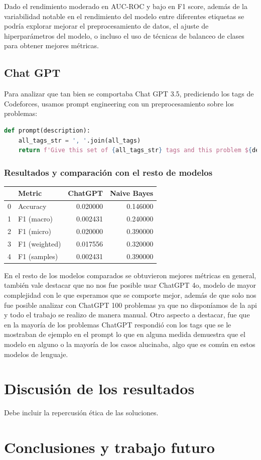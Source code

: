 \documentclass{article}
\begin{document}
    Dado el rendimiento moderado en AUC-ROC y bajo en F1 score, además de la variabilidad notable en 
    el rendimiento del modelo entre diferentes etiquetas se podría explorar mejorar el 
    preprocesamiento de datos, el ajuste de hiperparámetros del modelo, o incluso el uso de técnicas 
    de balanceo de clases para obtener mejores métricas.

\subsection{Chat GPT}

Para analizar que tan bien se comportaba Chat GPT 3.5, prediciendo los tags de Codeforces, usamos prompt engineering
con un preprocesamiento sobre los problemas:

\begin{lstlisting}[language=Python, caption=Prompt para tagear los problemas]
def prompt(description):
    all_tags_str = ', '.join(all_tags)
    return f'Give this set of {all_tags_str} tags and this problem ${description}, give me the set of problem tags in the following format: greedy, implementation, dp'
\end{lstlisting}

\subsubsection{Resultados y comparación con el resto de modelos}

\begin{tabular}{llrr}
    \toprule
    {} & Metric        & ChatGPT  & Naive Bayes \\
    \midrule
    0  & Accuracy      & 0.020000 & 0.146000    \\
    1  & F1 (macro)    & 0.002431 & 0.240000    \\
    2  & F1 (micro)    & 0.020000 & 0.390000    \\
    3  & F1 (weighted) & 0.017556 & 0.320000    \\
    4  & F1 (samples)  & 0.002431 & 0.390000    \\
    \bottomrule
\end{tabular}

En el resto de los modelos comparados se obtuvieron mejores métricas en general, también vale destacar que no nos fue posible
usar ChatGPT 4o, modelo de mayor complejidad con le que esperamos que se comporte mejor, además de que solo nos fue posible 
analizar con ChatGPT 100 problemas ya que no disponíamos de la api y todo el trabajo se realizo de manera manual. Otro aspecto
a destacar, fue que en la mayoría de los problemas ChatGPT respondió  con los tags que se le mostraban de ejemplo en el prompt
lo que en alguna medida demuestra que el modelo en alguno o la mayoría de los casos alucinaba, algo que es común en estos modelos 
de lenguaje.

\section{Discusión de los resultados}
Debe incluir la repercusión ética de las soluciones.

\section{Conclusiones y trabajo futuro}
\end{document}

